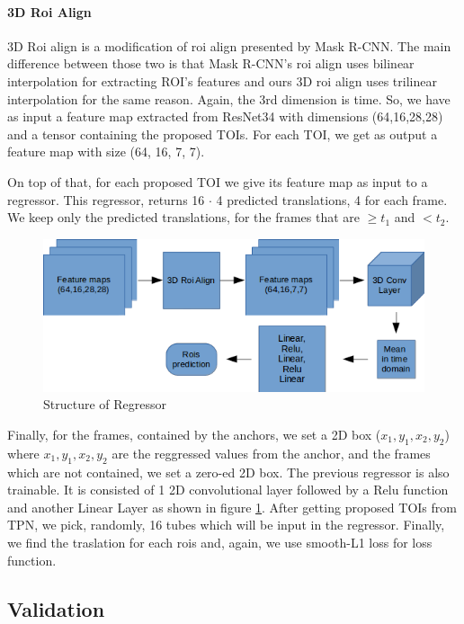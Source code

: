 \documentclass{report}
\begin{document}
\paragraph{3D Roi Align}
3D Roi align is a modification of roi align presented by Mask R-CNN\cite{}. The main difference between those two is that Mask R-CNN's roi align uses
bilinear interpolation for extracting ROI's features and ours 3D roi align uses trilinear interpolation for the same reason. Again, the 3rd dimension is
time.
So, we have as input a feature map extracted from ResNet34 with dimensions (64,16,28,28) and a tensor containing the proposed TOIs.
For each TOI, we get as output a feature map with size (64, 16, 7, 7). \par
On top of that, for each proposed TOI we give its feature map as input to a regressor. This regressor, returns 16 $\cdot$ 4 predicted translations, 4 for each frame.
We keep only the predicted translations, for the frames that are $\ge t_1$ and $< t_2$. 
\begin{figure}[h]
  \centering
  \includegraphics[scale=0.5]{regressor_1_3d}
  \caption{Structure of Regressor}
  \label{fig:regressor_3d}
\end{figure}

Finally, for the frames, contained by the anchors, we set a 2D box ($x_1,y_1,x_2,y_2$) where $x_1, y_1, x_2, y_2$ are the reggressed values from the anchor,
and the frames which are not contained, we set a zero-ed 2D box. The previous regressor is also trainable. It is consisted of 1 2D convolutional layer followed by a
Relu function and another Linear Layer as shown in figure \ref{fig:regressor_3d}. After getting proposed TOIs from TPN, we pick, randomly, 16 tubes which will be input in the regressor.
Finally, we find the traslation for each rois and, again, we use smooth-L1 loss for loss function.\par

\subsection{Validation}
\end{document}

